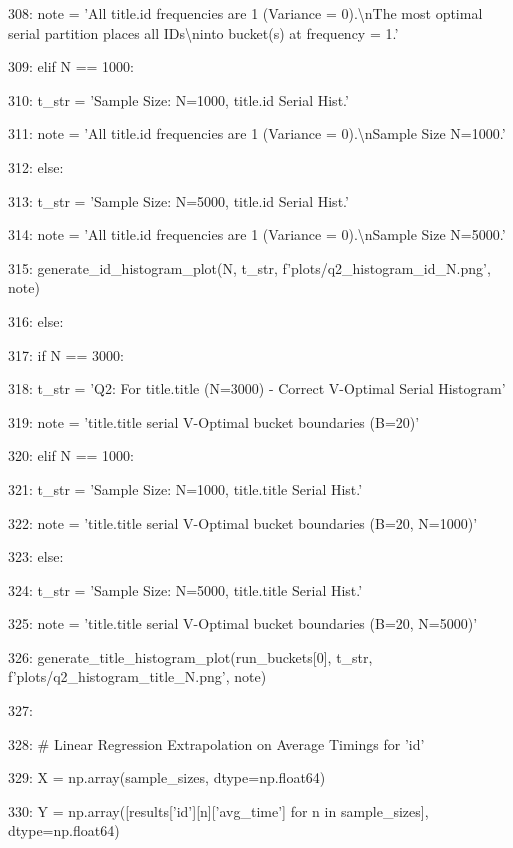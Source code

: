 \documentclass[11pt,a4paper]{article}
\begin{document}
308:                     note = 'All title.id frequencies are 1 (Variance = 0).\textbackslash{}nThe most optimal serial partition places all IDs\textbackslash{}ninto bucket(s) at frequency = 1.'

309:                 elif N == 1000:

310:                     t\_str = 'Sample Size: N=1000, title.id Serial Hist.'

311:                     note = 'All title.id frequencies are 1 (Variance = 0).\textbackslash{}nSample Size N=1000.'

312:                 else:

313:                     t\_str = 'Sample Size: N=5000, title.id Serial Hist.'

314:                     note = 'All title.id frequencies are 1 (Variance = 0).\textbackslash{}nSample Size N=5000.'

315:                 generate\_id\_histogram\_plot(N, t\_str, f'plots/q2\_histogram\_id\_{N}.png', note)

316:             else:

317:                 if N == 3000:

318:                     t\_str = 'Q2: For title.title (N=3000) - Correct V-Optimal Serial Histogram'

319:                     note = 'title.title serial V-Optimal bucket boundaries (B=20)'

320:                 elif N == 1000:

321:                     t\_str = 'Sample Size: N=1000, title.title Serial Hist.'

322:                     note = 'title.title serial V-Optimal bucket boundaries (B=20, N=1000)'

323:                 else:

324:                     t\_str = 'Sample Size: N=5000, title.title Serial Hist.'

325:                     note = 'title.title serial V-Optimal bucket boundaries (B=20, N=5000)'

326:                 generate\_title\_histogram\_plot(run\_buckets[0], t\_str, f'plots/q2\_histogram\_title\_{N}.png', note)

327:

328:     \# Linear Regression Extrapolation on Average Timings for 'id'

329:     X = np.array(sample\_sizes, dtype=np.float64)

330:     Y = np.array([results['id'][n]['avg\_time'] for n in sample\_sizes], dtype=np.float64)
\end{document}
